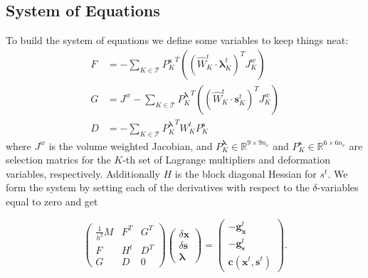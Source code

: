 \documentclass[letterpaper,12pt]{article}
\theoremstyle{remark}
\newcommand{\R}{\mathbb{R}}
\newcommand{\Th}{\mathcal{T}}
\newcommand{\x}{\mathbf{x}}
\newcommand{\C}{\mathbf{c}}
\newcommand{\s}{\mathbf{s}}
\newcommand{\la}{\mathbf{\lambda}}
\newcommand{\dx}{\delta \x}
\newcommand{\ds}{\delta \s}
\newcommand{\gx}{ {\mathbf{g}_\x^t} }
\newcommand{\gs}{ {\mathbf{g}_\s^t} }
\begin{document}
\subsection{System of Equations}
To build the system of equations we define some variables to keep things neat:
\begin{align}
F &= - \sum_{K \in \Th} {P_K^\s}^T \left((\hat{W}_K^{t}\cdot \la_K^t)^T J_K^w \right) \\
G &= J^w - \sum_{K \in \Th} {P_K^\la}^T \left((\hat{W}_K^{t}\cdot \s_K^t)^T J_K^w \right) \\
D &= -\sum_{K \in \Th} {P_K^\la}^T  W_K^t P_K^\s
\end{align}
where $J^w$ is the volume weighted Jacobian, and $P_K^\la \in \R^{9 \times 9n_e}$ and $P_K^\s \in \R^{6 \times 6n_e}$ are selection matrics for the $K$-th set of Lagrange multipliers and deformation variables, respectively. Additionally $H$ is the block diagonal Hessian for $s^t$. We form the system by setting each of the derivatives with respect to the $\delta$-variables equal to zero and get

\begin{equation}
\begin{pmatrix}
\frac{1}{h^2}M & F^T & G^T \\
F & H^t & D^T\\
G & D & 0
\end{pmatrix}
\begin{pmatrix}
\dx \\
\ds \\
\la
\end{pmatrix} =
\begin{pmatrix}
-\gx \\
-\gs \\
\C (\x^t, \s^t)
\end{pmatrix}.
\end{equation}
\end{document}
